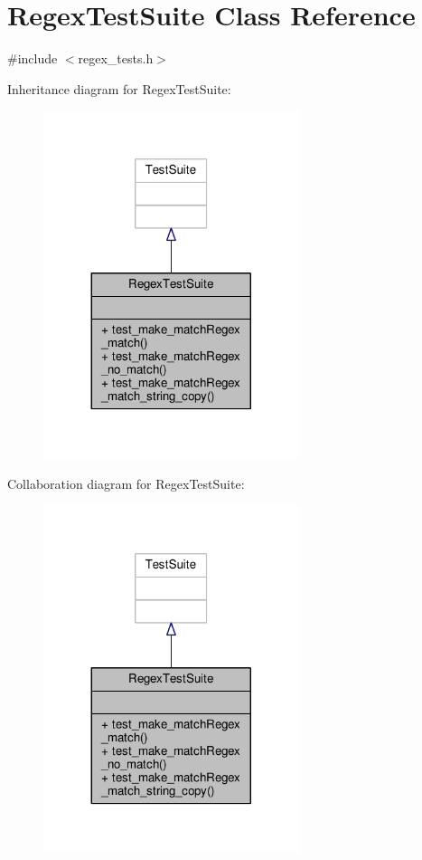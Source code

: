 \hypertarget{classRegexTestSuite}{\section{Regex\-Test\-Suite Class Reference}
\label{classRegexTestSuite}
}


{\ttfamily \#include $<$regex\-\_\-tests.\-h$>$}



Inheritance diagram for Regex\-Test\-Suite\-:\nopagebreak
\begin{figure}[H]
\begin{center}
\leavevmode
\includegraphics[width=212pt]{classRegexTestSuite__inherit__graph}
\end{center}
\end{figure}


Collaboration diagram for Regex\-Test\-Suite\-:\nopagebreak
\begin{figure}[H]
\begin{center}
\leavevmode
\includegraphics[width=212pt]{classRegexTestSuite__coll__graph}
\end{center}
\end{figure}
